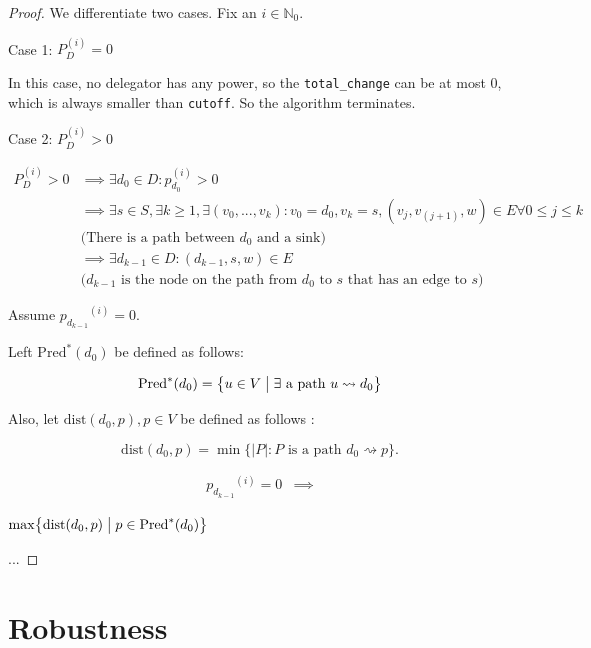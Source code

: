 \begin{proof} We differentiate two cases. Fix an $i \in \mathbb{N}_0$.

Case 1: $P_D^{(i)} = 0$

In this case, no delegator has any power, so the \texttt{total\_change} can be at most 0, which is always smaller than \texttt{cutoff}. So the algorithm terminates.

Case 2: $P_D^{(i)} > 0$

\begin{align*}
P_D^{(i)} > 0 
& \implies \exists d_0 \in D: p_{d_0}^{(i)} > 0 \\ 
& \implies \exists s \in S, \exists k \ge 1, \exists (v_0, ..., v_k): v_0 = d_0, v_k= s, (v_j, v_{(j+1)}, w) \in E \forall 0 \le j \le k \\
&\text{(There is a path between $d_0$ and a sink)} \\
& \implies \exists d_{k-1} \in D: (d_{k-1}, s, w) \in E \\
& \text{($d_{k-1}$ is the node on the path from $d_0$ to $s$ that has an edge to $s$)}
\end{align*}

Assume ${p_{d_{k-1}}}^{(i)} = 0$.

Left $\mathrm{Pred}^*(d_0)$ be defined as follows:

\[
\mathrm{Pred}^*(d_{0})=\bigl\{u \in V \bigm| \exists\text{ a path }u \rightsquigarrow d_{0} \bigr\}
\]

Also, let $\mathrm{dist}(d_{0}, p), p \in V$  be defined as follows :

\[
\mathrm{dist}(d_{0},p) =\min\bigl\{|P| : P\text{ is a path }d_{0}\rightsquigarrow p\bigr\}.
\]

\begin{align*}
{p_{d_{k-1}}}^{(i)} = 0 &\implies 
\end{align*}

$\max\bigl\{\mathrm{dist}(d_0,p)\bigm|p\in \mathrm{Pred}^*(d_0)\bigr\} $

...




\end{proof}


\section{Robustness}

